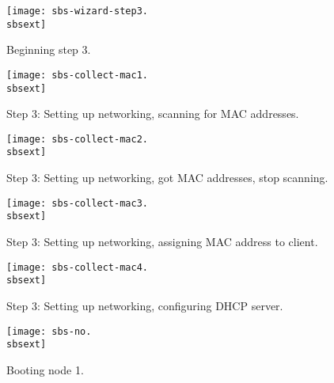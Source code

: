 \begin{figure}[htbp]
  \begin{center}
    \texttt{[image: sbs-wizard-step3.\\sbsext]}
    \caption{Beginning step 3.}
    \label{fig:sbs-install-wizard-s3}
  \end{center}
\end{figure}

\begin{figure}[htbp]
  \begin{center}
    \texttt{[image: sbs-collect-mac1.\\sbsext]}
    \caption{Step 3: Setting up networking, scanning for MAC addresses.}
    \label{fig:sbs-setup-network1}
  \end{center}
\end{figure}

\begin{figure}[htbp]
  \begin{center}
    \texttt{[image: sbs-collect-mac2.\\sbsext]}
    \caption{Step 3: Setting up networking, got MAC addresses, stop scanning.}
    \label{fig:sbs-setup-network2}
  \end{center}
\end{figure}

\begin{figure}[htbp]
  \begin{center}
    \texttt{[image: sbs-collect-mac3.\\sbsext]}
    \caption{Step 3: Setting up networking, assigning MAC address to client.}
    \label{fig:sbs-setup-network3}
  \end{center}
\end{figure}

\begin{figure}[htbp]
  \begin{center}
    \texttt{[image: sbs-collect-mac4.\\sbsext]}
    \caption{Step 3: Setting up networking, configuring DHCP server.}
    \label{fig:sbs-setup-network4}
  \end{center}
\end{figure}



\clearpage
\setlength{\oddsidemargin}{-0.5in}
\setlength{\evensidemargin}{-0.5in}
\setlength{\textwidth}{7.5in}

\begin{figure}[htbp]
  \begin{center}
    \texttt{[image: sbs-no.\\sbsext]}
    \caption{Booting node 1.}
    \label{fig:sbs-node1-boot}
  \end{center}
\end{figure}

